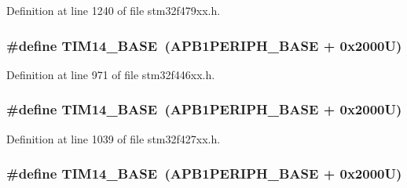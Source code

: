 Definition at line 1240 of file stm32f479xx.\+h.

\subsubsection[{\texorpdfstring{T\+I\+M14\+\_\+\+B\+A\+SE}{TIM14_BASE}}]{\setlength{\rightskip}{0pt plus 5cm}\#define T\+I\+M14\+\_\+\+B\+A\+SE~({\bf A\+P\+B1\+P\+E\+R\+I\+P\+H\+\_\+\+B\+A\+SE} + 0x2000\+U)}\hypertarget{group___peripheral__memory__map_ga862855347d6e1d92730dfe17ee8e90b8}{}\label{group___peripheral__memory__map_ga862855347d6e1d92730dfe17ee8e90b8}


Definition at line 971 of file stm32f446xx.\+h.

\subsubsection[{\texorpdfstring{T\+I\+M14\+\_\+\+B\+A\+SE}{TIM14_BASE}}]{\setlength{\rightskip}{0pt plus 5cm}\#define T\+I\+M14\+\_\+\+B\+A\+SE~({\bf A\+P\+B1\+P\+E\+R\+I\+P\+H\+\_\+\+B\+A\+SE} + 0x2000\+U)}\hypertarget{group___peripheral__memory__map_ga862855347d6e1d92730dfe17ee8e90b8}{}\label{group___peripheral__memory__map_ga862855347d6e1d92730dfe17ee8e90b8}


Definition at line 1039 of file stm32f427xx.\+h.

\subsubsection[{\texorpdfstring{T\+I\+M14\+\_\+\+B\+A\+SE}{TIM14_BASE}}]{\setlength{\rightskip}{0pt plus 5cm}\#define T\+I\+M14\+\_\+\+B\+A\+SE~({\bf A\+P\+B1\+P\+E\+R\+I\+P\+H\+\_\+\+B\+A\+SE} + 0x2000\+U)}\hypertarget{group___peripheral__memory__map_ga862855347d6e1d92730dfe17ee8e90b8}{}\label{group___peripheral__memory__map_ga862855347d6e1d92730dfe17ee8e90b8}


